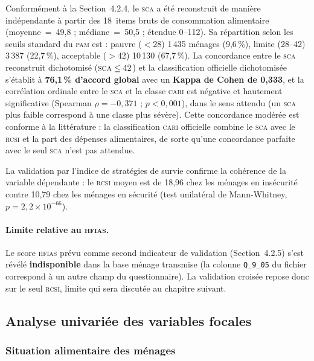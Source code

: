 Conformément à la Section~4.2.4, le \textsc{sca} a été reconstruit de manière
indépendante à partir des 18~items bruts de consommation alimentaire
(moyenne~=~49,8 ; médiane~=~50,5 ; étendue 0--112). Sa répartition selon les
seuils standard du \textsc{pam} est : pauvre ($<28$) 1\,435 ménages (9,6\,\%),
limite (28--42) 3\,387 (22,7\,\%), acceptable ($>42$) 10\,130 (67,7\,\%). La
concordance entre le \textsc{sca} reconstruit dichotomisé
($\textsc{sca} \leq 42$) et la classification officielle dichotomisée s'établit
à \textbf{76,1\,\% d'accord global} avec un \textbf{Kappa de Cohen de 0,333},
et la corrélation ordinale entre le \textsc{sca} et la classe \textsc{cari} est
négative et hautement significative (Spearman $\rho = -0{,}371$ ;
$p < 0{,}001$), dans le sens attendu (un \textsc{sca} plus faible correspond à
une classe plus sévère). Cette concordance modérée est conforme à la
littérature : la classification \textsc{cari} officielle combine le \textsc{sca}
avec le \textsc{rcsi} et la part des dépenses alimentaires, de sorte qu'une
concordance parfaite avec le seul \textsc{sca} n'est pas attendue.

La validation par l'indice de stratégies de survie confirme la cohérence de la
variable dépendante : le \textsc{rcsi} moyen est de 18,96 chez les ménages en
insécurité contre 10,79 chez les ménages en sécurité (test unilatéral de
Mann-Whitney, $p = 2{,}2 \times 10^{-66}$).

\paragraph{Limite relative au \textsc{hfias}.} Le score \textsc{hfias} prévu
comme second indicateur de validation (Section~4.2.5) s'est révélé
\textbf{indisponible} dans la base ménage transmise (la colonne \texttt{Q\_9\_05}
du fichier correspond à un autre champ du questionnaire). La validation croisée
repose donc sur le seul \textsc{rcsi}, limite qui sera discutée au chapitre
suivant.

\subsection{Analyse univariée des variables focales}
\label{ssec:res-univarie}

\subsubsection{Situation alimentaire des ménages}

